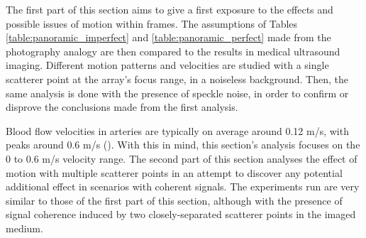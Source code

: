 The first part of this section aims to give a first exposure to the effects and possible issues of motion within frames. The assumptions of Tables \ref{table:panoramic_imperfect} and \ref{table:panoramic_perfect} made from the photography analogy are then compared to the results in medical ultrasound imaging. Different motion patterns and velocities are studied with a single scatterer point at the array's focus range, in a noiseless background. Then, the same analysis is done with the presence of speckle noise, in order to confirm or disprove the conclusions made from the first analysis.

Blood flow velocities in arteries are typically on average around 0.12 m/s, with peaks around 0.6 m/s (\cite{Blood_flow}). With this in mind, this section's analysis focuses on the 0 to 0.6 m/s velocity range.
The second part of this section analyses the effect of motion with multiple scatterer points in an attempt to discover any potential additional effect in scenarios with coherent signals. The experiments run are very similar to those of the first part of this section, although with the presence of signal coherence induced by two closely-separated scatterer points in the imaged medium.
